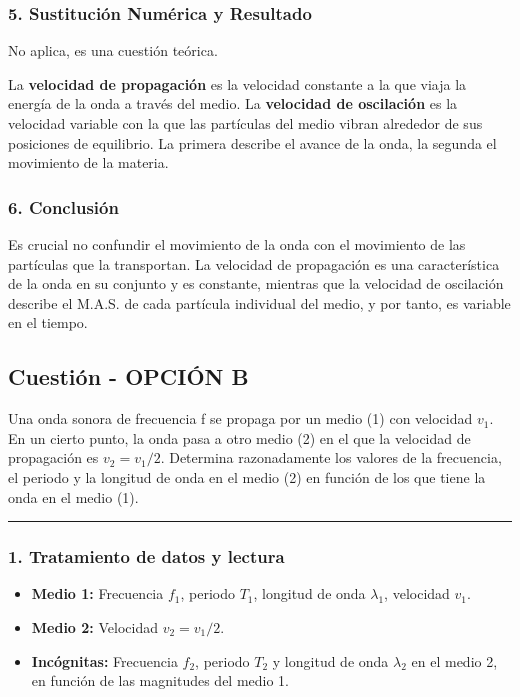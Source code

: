 \subsubsection*{5. Sustitución Numérica y Resultado}
No aplica, es una cuestión teórica.
\begin{cajaresultado}
La \textbf{velocidad de propagación} es la velocidad constante a la que viaja la energía de la onda a través del medio. La \textbf{velocidad de oscilación} es la velocidad variable con la que las partículas del medio vibran alrededor de sus posiciones de equilibrio. La primera describe el avance de la onda, la segunda el movimiento de la materia.
\end{cajaresultado}

\subsubsection*{6. Conclusión}
\begin{cajaconclusion}
Es crucial no confundir el movimiento de la onda con el movimiento de las partículas que la transportan. La velocidad de propagación es una característica de la onda en su conjunto y es constante, mientras que la velocidad de oscilación describe el M.A.S. de cada partícula individual del medio, y por tanto, es variable en el tiempo.
\end{cajaconclusion}
\newpage

\subsection{Cuestión - OPCIÓN B}
\label{subsec:B2B_2017_jun_ord}

\begin{cajaenunciado}
Una onda sonora de frecuencia f se propaga por un medio (1) con velocidad $v_1$. En un cierto punto, la onda pasa a otro medio (2) en el que la velocidad de propagación es $v_2 = v_1/2$. Determina razonadamente los valores de la frecuencia, el periodo y la longitud de onda en el medio (2) en función de los que tiene la onda en el medio (1).
\end{cajaenunciado}
\hrule

\subsubsection*{1. Tratamiento de datos y lectura}
\begin{itemize}
    \item \textbf{Medio 1:} Frecuencia $f_1$, periodo $T_1$, longitud de onda $\lambda_1$, velocidad $v_1$.
    \item \textbf{Medio 2:} Velocidad $v_2 = v_1/2$.
    \item \textbf{Incógnitas:} Frecuencia $f_2$, periodo $T_2$ y longitud de onda $\lambda_2$ en el medio 2, en función de las magnitudes del medio 1.
\end{itemize}

